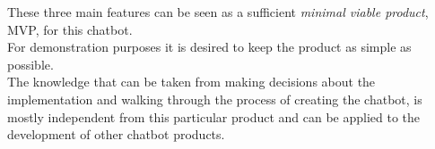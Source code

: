 These three main features can be seen as a sufficient \emph{minimal viable product}, MVP, for this chatbot.
\\

For demonstration purposes it is desired to keep the product as simple as possible.
\\
The knowledge that can be taken from making decisions about the implementation and walking through the process of creating the chatbot,
is mostly independent from this particular product and can be applied to the development of other chatbot products.
